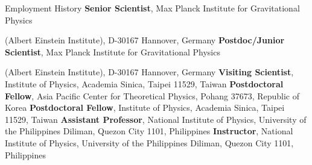 \begin{rubric}{Employment History}
%
	\textbf{Senior Scientist}, Max Planck Institute for Gravitational Physics\par (Albert Einstein Institute), D-30167 Hannover, Germany
%
	\textbf{Postdoc/Junior Scientist}, Max Planck Institute for Gravitational Physics\par (Albert Einstein Institute), D-30167 Hannover, Germany
%
%
	\textbf{Visiting Scientist}, Institute of Physics, Academia Sinica, Taipei 11529, Taiwan
%
%
	\textbf{Postdoctoral Fellow}, Asia Pacific Center for Theoretical Physics, Pohang 37673, Republic of Korea
%
%
	\textbf{Postdoctoral Fellow}, Institute of Physics, Academia Sinica, Taipei 11529, Taiwan
%
%
%
	\textbf{Assistant Professor}, National Institute of Physics, University of the Philippines Diliman, Quezon City 1101, Philippines
%
%
	\textbf{Instructor}, National Institute of Physics, University of the Philippines Diliman, Quezon City 1101, Philippines
\end{rubric}
